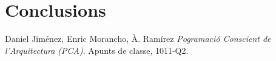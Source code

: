 \documentclass[final,a4paper,11pt]{report}
\begin{document}


\tableofcontents
\newpage





\chapter{Conclusions}

\begin{thebibliography}{9}

  Daniel Jiménez, Enric Morancho, À. Ramírez
  \emph{Pogramació Conscient de l'Arquitectura (PCA)}.
  Apunts de classe,
  1011-Q2.

\end{thebibliography}
\end{document}
